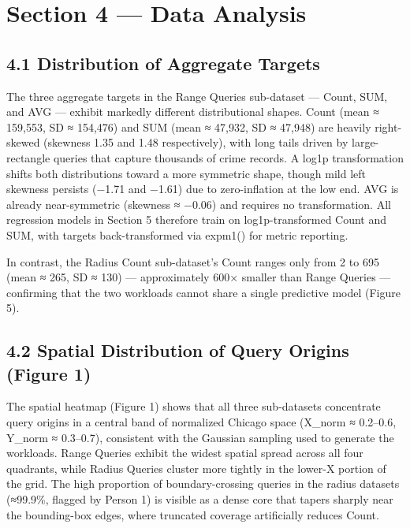 \documentclass[
  10pt,
  twocolumn,
  10pt]{article}
\begin{document}
\section{Section 4 --- Data Analysis}\label{section-4-data-analysis}

\subsection{4.1 Distribution of Aggregate
Targets}\label{distribution-of-aggregate-targets}

The three aggregate targets in the Range Queries sub-dataset --- Count,
SUM, and AVG --- exhibit markedly different distributional shapes. Count
(mean ≈ 159,553, SD ≈ 154,476) and SUM (mean ≈ 47,932, SD ≈ 47,948) are
heavily right-skewed (skewness 1.35 and 1.48 respectively), with long
tails driven by large-rectangle queries that capture thousands of crime
records. A log1p transformation shifts both distributions toward a more
symmetric shape, though mild left skewness persists (−1.71 and −1.61)
due to zero-inflation at the low end. AVG is already near-symmetric
(skewness ≈ −0.06) and requires no transformation. All regression models
in Section 5 therefore train on log1p-transformed Count and SUM, with
targets back-transformed via expm1() for metric reporting.

In contrast, the Radius Count sub-dataset's Count ranges only from 2 to
695 (mean ≈ 265, SD ≈ 130) --- approximately 600× smaller than Range
Queries --- confirming that the two workloads cannot share a single
predictive model (Figure 5).

\subsection{4.2 Spatial Distribution of Query Origins (Figure
1)}\label{spatial-distribution-of-query-origins-figure-1}

The spatial heatmap (Figure 1) shows that all three sub-datasets
concentrate query origins in a central band of normalized Chicago space
(X\_norm ≈ 0.2--0.6, Y\_norm ≈ 0.3--0.7), consistent with the Gaussian
sampling used to generate the workloads. Range Queries exhibit the
widest spatial spread across all four quadrants, while Radius Queries
cluster more tightly in the lower-X portion of the grid. The high
proportion of boundary-crossing queries in the radius datasets (≈99.9\%,
flagged by Person 1) is visible as a dense core that tapers sharply near
the bounding-box edges, where truncated coverage artificially reduces
Count.
\end{document}
